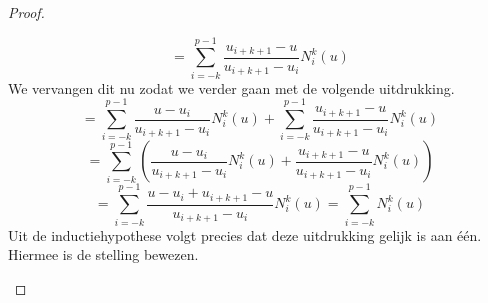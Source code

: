 \documentclass[examenvragen.tex]{subfiles}
\begin{document}
\begin{proof}
\begin{enumerate}
\[=
\sum_{i=-k}^{p-1}
\frac{u_{i+k+1}-u}{u_{i+k+1}-u_{i}}			N_{i}^{k}(u)
\]
We vervangen dit nu zodat we verder gaan met de volgende uitdrukking.
\[
=
\sum_{i=-k}^{p-1}
\frac{u-u_i}{u_{i+k+1}-u_i}					N_{i}^{k}(u)
+ 
\sum_{i=-k}^{p-1}
\frac{u_{i+k+1}-u}{u_{i+k+1}-u_{i}}			N_{i}^{k}(u)
\]
\[
=
\sum_{i=-k}^{p-1}
\left(
\frac{u-u_i}{u_{i+k+1}-u_i}					N_{i}^{k}(u)
+ 
\frac{u_{i+k+1}-u}{u_{i+k+1}-u_{i}}			N_{i}^{k}(u)
\right)
\]
\[
=
\sum_{i=-k}^{p-1}
\frac{u-u_i + u_{i+k+1}-u}{u_{i+k+1}-u_{i}} N_{i}^{k}(u)
=
\sum_{i=-k}^{p-1}
N_{i}^{k}(u)
\]
Uit de inductiehypothese volgt precies dat deze uitdrukking gelijk is aan \'e\'en. Hiermee is de stelling bewezen.
\end{enumerate}
\end{proof}
\end{document}
